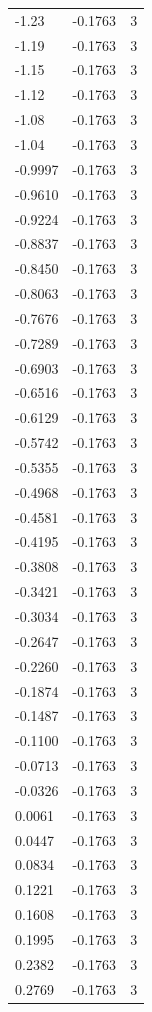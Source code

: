 \begin{longtable}{lrr}
  -1.23 & -0.1763 & 3 \\
  -1.19 & -0.1763 & 3 \\
  -1.15 & -0.1763 & 3 \\
  -1.12 & -0.1763 & 3 \\
  -1.08 & -0.1763 & 3 \\
  -1.04 & -0.1763 & 3 \\
  -0.9997 & -0.1763 & 3 \\
  -0.9610 & -0.1763 & 3 \\
  -0.9224 & -0.1763 & 3 \\
  -0.8837 & -0.1763 & 3 \\
  -0.8450 & -0.1763 & 3 \\
  -0.8063 & -0.1763 & 3 \\
  -0.7676 & -0.1763 & 3 \\
  -0.7289 & -0.1763 & 3 \\
  -0.6903 & -0.1763 & 3 \\
  -0.6516 & -0.1763 & 3 \\
  -0.6129 & -0.1763 & 3 \\
  -0.5742 & -0.1763 & 3 \\
  -0.5355 & -0.1763 & 3 \\
  -0.4968 & -0.1763 & 3 \\
  -0.4581 & -0.1763 & 3 \\
  -0.4195 & -0.1763 & 3 \\
  -0.3808 & -0.1763 & 3 \\
  -0.3421 & -0.1763 & 3 \\
  -0.3034 & -0.1763 & 3 \\
  -0.2647 & -0.1763 & 3 \\
  -0.2260 & -0.1763 & 3 \\
  -0.1874 & -0.1763 & 3 \\
  -0.1487 & -0.1763 & 3 \\
  -0.1100 & -0.1763 & 3 \\
  -0.0713 & -0.1763 & 3 \\
  -0.0326 & -0.1763 & 3 \\
  0.0061 & -0.1763 & 3 \\
  0.0447 & -0.1763 & 3 \\
  0.0834 & -0.1763 & 3 \\
  0.1221 & -0.1763 & 3 \\
  0.1608 & -0.1763 & 3 \\
  0.1995 & -0.1763 & 3 \\
  0.2382 & -0.1763 & 3 \\
  0.2769 & -0.1763 & 3 \\

\end{longtable}
